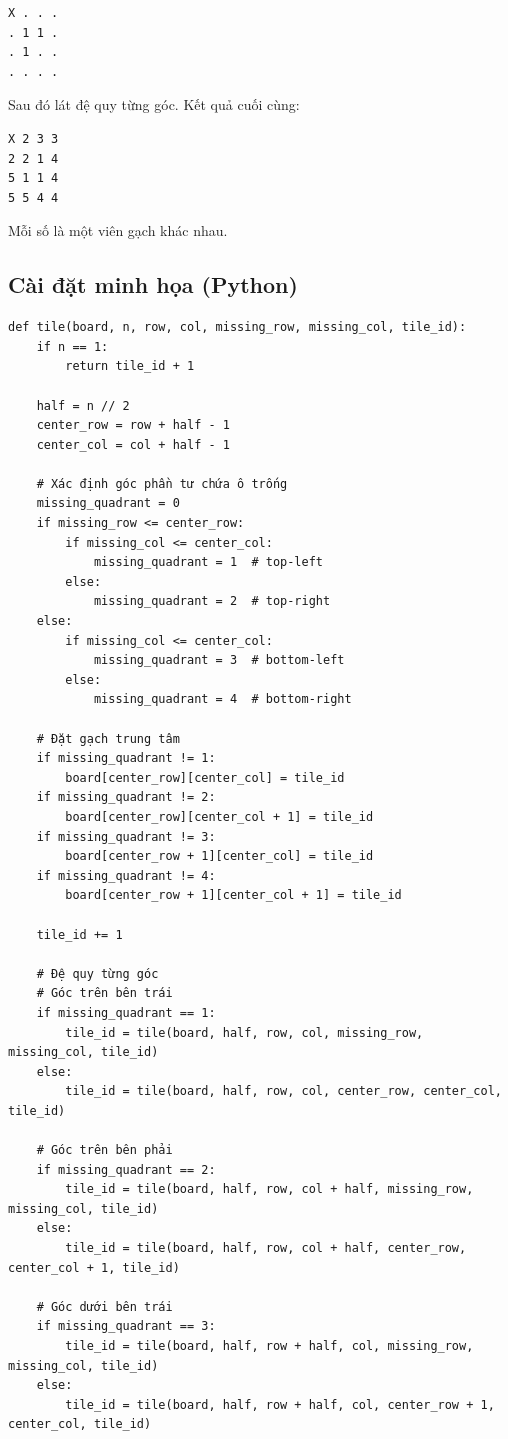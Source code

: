 \documentclass{article}
\begin{document}
\begin{verbatim}
X . . .
. 1 1 .
. 1 . .
. . . .
\end{verbatim}

Sau đó lát đệ quy từng góc. Kết quả cuối cùng:

\begin{verbatim}
X 2 3 3
2 2 1 4
5 1 1 4
5 5 4 4
\end{verbatim}

Mỗi số là một viên gạch khác nhau.

\subsection{Cài đặt minh họa (Python)}

\begin{verbatim}
def tile(board, n, row, col, missing_row, missing_col, tile_id):
    if n == 1:
        return tile_id + 1
    
    half = n // 2
    center_row = row + half - 1
    center_col = col + half - 1
    
    # Xác định góc phần tư chứa ô trống
    missing_quadrant = 0
    if missing_row <= center_row:
        if missing_col <= center_col:
            missing_quadrant = 1  # top-left
        else:
            missing_quadrant = 2  # top-right
    else:
        if missing_col <= center_col:
            missing_quadrant = 3  # bottom-left
        else:
            missing_quadrant = 4  # bottom-right
    
    # Đặt gạch trung tâm
    if missing_quadrant != 1:
        board[center_row][center_col] = tile_id
    if missing_quadrant != 2:
        board[center_row][center_col + 1] = tile_id
    if missing_quadrant != 3:
        board[center_row + 1][center_col] = tile_id
    if missing_quadrant != 4:
        board[center_row + 1][center_col + 1] = tile_id
    
    tile_id += 1
    
    # Đệ quy từng góc
    # Góc trên bên trái
    if missing_quadrant == 1:
        tile_id = tile(board, half, row, col, missing_row, missing_col, tile_id)
    else:
        tile_id = tile(board, half, row, col, center_row, center_col, tile_id)
    
    # Góc trên bên phải
    if missing_quadrant == 2:
        tile_id = tile(board, half, row, col + half, missing_row, missing_col, tile_id)
    else:
        tile_id = tile(board, half, row, col + half, center_row, center_col + 1, tile_id)
    
    # Góc dưới bên trái
    if missing_quadrant == 3:
        tile_id = tile(board, half, row + half, col, missing_row, missing_col, tile_id)
    else:
        tile_id = tile(board, half, row + half, col, center_row + 1, center_col, tile_id)
    

\end{verbatim}
\end{document}
